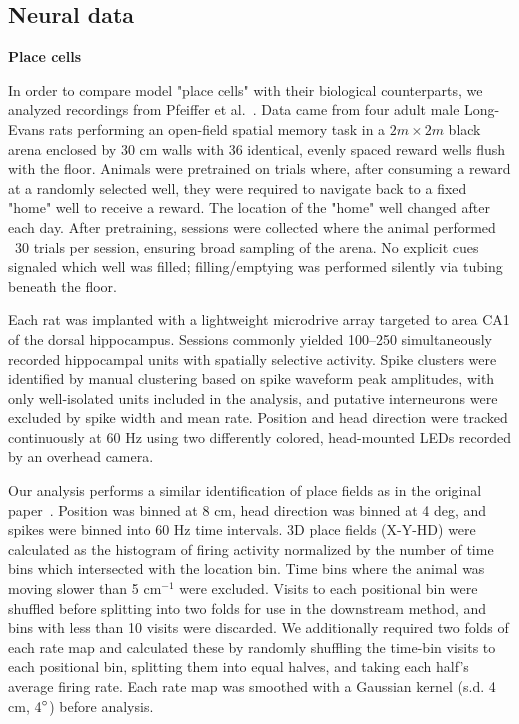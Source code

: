 \documentclass[11pt]{article}
\begin{document}
\subsection{Neural data}

{\bf Place cells}

In order to compare model "place cells" with their biological counterparts, we analyzed recordings from Pfeiffer et al.~\cite{Pfeiffer2013}. Data came from four adult male Long-Evans rats performing an open-field spatial memory task in a $2 m \times 2 m$ black arena enclosed by 30 cm walls with 36 identical, evenly spaced reward wells flush with the floor. Animals were pretrained on trials where, after consuming a reward at a randomly selected well, they were required to navigate back to a fixed "home" well to receive a reward. The location of the "home" well changed after each day. After pretraining, sessions were collected where the animal performed ~30 trials per session, ensuring broad sampling of the arena. No explicit cues signaled which well was filled; filling/emptying was performed silently via tubing beneath the floor.

Each rat was implanted with a lightweight microdrive array targeted to area CA1 of the dorsal hippocampus. Sessions commonly yielded 100–250 simultaneously recorded hippocampal units with spatially selective activity. Spike clusters were identified by manual clustering based on spike waveform peak amplitudes, with only well-isolated units included in the analysis, and putative interneurons were excluded by spike width and mean rate. Position and head direction were tracked continuously at 60 Hz using two differently colored, head-mounted LEDs recorded by an overhead camera. 

Our analysis performs a similar identification of place fields as in the original paper~\cite{Pfeiffer2013}. Position was binned at 8 cm, head direction was binned at 4 deg, and spikes were binned into 60 Hz time intervals. 3D place fields (X-Y-HD) were calculated as the histogram of firing activity normalized by the number of time bins which intersected with the location bin. Time bins where the animal was moving slower than 5 cm$^{-1}$ were excluded. Visits to each positional bin were shuffled before splitting into two folds for use in the downstream method, and bins with less than 10 visits were discarded. We additionally required two folds of each rate map and calculated these by randomly shuffling the time-bin visits to each positional bin, splitting them into equal halves, and taking each half's average firing rate. Each rate map was smoothed with a Gaussian kernel (s.d. 4 cm, 4$\degree$) before analysis.
\end{document}
